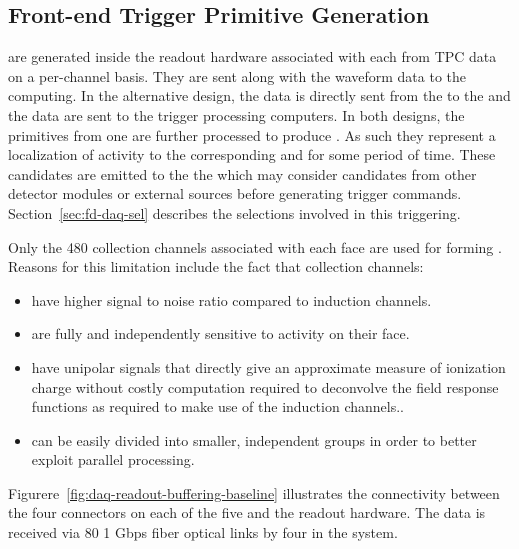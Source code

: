 
\subsection{Front-end Trigger Primitive Generation}
\label{sec:fd-daq-fetp}


 are generated inside the  readout
hardware associated with each  from TPC data on a per-channel basis.
They are sent along with the waveform data to the  
computing.
In the alternative design, the data is directly sent from the  to
the  and the data are sent to the trigger processing
computers.  
In both designs, the primitives from one  are further
processed to produce . 
As such they represent a localization of activity to the corresponding
 and for some period of time. 
These candidates are emitted to the the  which may consider
candidates from other detector modules or external sources before
generating trigger commands.
Section~\ref{sec:fd-daq-sel} describes the selections involved in this
triggering.

Only the 480 collection channels associated with each  face are
used for forming . 
Reasons for this limitation include the fact that collection
channels:

\begin{itemize}
\item have higher signal to noise ratio compared to induction channels.
\item are fully and independently sensitive to activity on their  face.
\item have unipolar signals that directly give an approximate measure
  of ionization charge without costly computation required to
  deconvolve the field response functions as required to make use of
  the induction channels..
\item can be easily divided into smaller, independent groups in order
  to better exploit parallel processing.
\end{itemize}


Figurere~\ref{fig:daq-readout-buffering-baseline} illustrates the connectivity between the
four connectors on each of the five  and the  readout hardware.
The data is received via 80 1 Gbps fiber optical links by four 
in the   system. 

